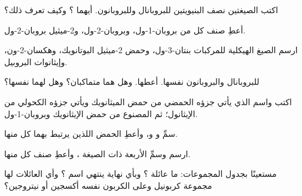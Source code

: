 \begin{exercise}[$\star$]\label{exo:g11:functional-groups:4}
اكتب الصيغتين نصف البنيويتين للبروبانال وللبروبانون. أيهما ؟
وكيف تعرف ذلك؟
\end{exercise}

\begin{exercise}[$\star$]\label{exo:g11:functional-groups:5}
أعطِ صنف كل من بروبان-1-ول، وبروبان-2-ول، و2-ميثيل بروبان-2-ول.
\end{exercise}

\begin{exercise}[$\star\star$]\label{exo:g11:functional-groups:6}
ارسم الصيغ الهيكلية للمركبات بنتان-3-ول، وحمض 2-ميثيل البوتانويك،
وهكسان-2-ون، وإيثانوات البروبيل.
\end{exercise}

\begin{exercise}[$\star\star$]\label{exo:g11:functional-groups:7}
للبروبانال والبروبانون  نفسها. أعطها. وهل
هما متماكبان؟ وهل لهما  نفسها؟
\end{exercise}

\begin{exercise}[$\star\star$]\label{exo:g11:functional-groups:8}
اكتب  واسم  الذي يأتي جزؤه الحمضي من حمض الميثانويك
 ويأتي جزؤه الكحولي من الإيثانول؛ ثم  المصنوع من حمض الإيثانويك
وبروبان-1-ول.
\end{exercise}

\begin{exercise}[$\star\star$]\label{exo:g11:functional-groups:9}
سمِّ   و
و، وأعطِ الحمض  اللذين يرتبط بهما كل منها.
\end{exercise}

\begin{exercise}[$\star\star$]\label{exo:g11:functional-groups:10}
ارسم وسمِّ  الأربعة ذات الصيغة ، وأعطِ
صنف كل منها.
\end{exercise}

\begin{exercise}[$\star\star$]\label{exo:g11:functional-groups:11}
مستعينًا بجدول المجموعات: ما عائلة ؟ وبأي
نهاية ينتهي اسم ؟ وأي العائلات لها مجموعة
كربونيل وعلى الكربون نفسه  أكسجين أو نيتروجين؟
\end{exercise}

